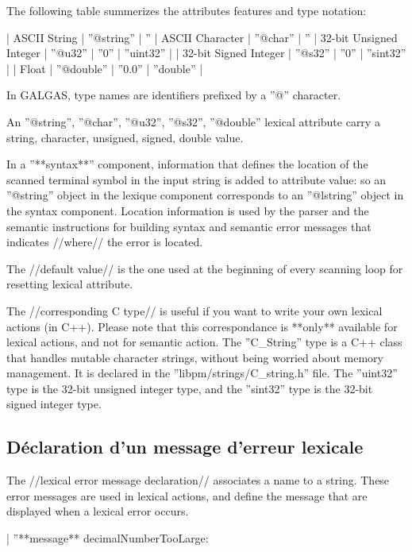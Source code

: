  The following table summerizes the attributes features and type notation:

| ASCII String | ''@string'' | ''%
| ASCII Character | ''@char'' | ''%
| 32-bit Unsigned Integer | ''@u32'' | ''0'' | ''uint32'' |
| 32-bit Signed Integer | ''@s32'' | ''0'' | ''sint32'' |
| Float | ''@double'' | ''0.0'' | ''double'' |

In GALGAS, type names are identifiers prefixed by a ''@'' character.

An ''@string'', ''@char'', ''@u32'', ''@s32'', ''@double'' lexical attribute carry a string, character, unsigned, signed, double value.

In a ''**syntax**'' component, information that defines the location of the scanned terminal symbol in the input string is added to attribute value: so an ''@string'' object in the lexique component corresponds to an ''@lstring'' object in the syntax component. Location information is used by the parser and the semantic instructions for building syntax and semantic error messages that indicates //where// the error is located.

The //default value// is the one used at the beginning of every scanning loop for resetting lexical attribute.

The //corresponding C type// is useful if you want to write your own lexical actions (in C++). Please note that this correspondance is **only** available for lexical actions, and not for semantic action. The ''C\_String'' type is a C++ class that handles mutable character strings, without being worried about memory management. It is declared in the ''libpm/strings/C\_string.h'' file. The ''uint32'' type is the 32-bit unsigned integer type, and the ''sint32'' type is the 32-bit signed integer type.


\subsection{Déclaration d'un message d'erreur lexicale}

The //lexical error message declaration// associates a name to a string. These error messages are used in lexical actions, and define the message that are displayed when a lexical error occurs.

|  ''**message** decimalNumberTooLarge: %



